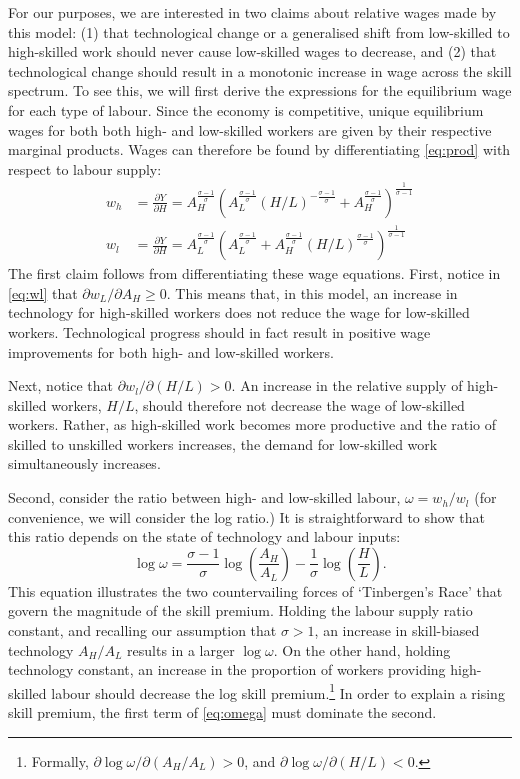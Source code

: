 \documentclass[a4paper,11pt]{article}
\begin{document}
For our purposes, we are interested in two claims about relative wages made by this model: (1) that technological change or a generalised shift from low-skilled to high-skilled work should never cause low-skilled wages to decrease, and (2) that technological change should result in a monotonic increase in wage across the skill spectrum. To see this, we will first derive the expressions for the equilibrium wage for each type of labour. Since the economy is competitive, unique equilibrium wages for both both high- and low-skilled workers are given by their respective marginal products. Wages can therefore be found by differentiating \eqref{eq:prod} with respect to labour supply:
\begin{align}
w_h &= \frac{\partial Y}{\partial H} 
     = A_H^\frac{\sigma-1}{\sigma}\left(
              A_L^{\frac{\sigma-1}{\sigma}} (H/L)^{-\frac{\sigma-1}{\sigma}} + A_H^{\frac{\sigma-1}{\sigma}}
        \right)^{\frac{1}{\sigma - 1}} \label{eq:wh} \\
w_l &= \frac{\partial Y}{\partial H} 
     = A_L^\frac{\sigma-1}{\sigma}\left(
              A_L^{\frac{\sigma-1}{\sigma}} + A_H^{\frac{\sigma-1}{\sigma}}(H/L)^{\frac{\sigma-1}{\sigma}}
        \right)^{\frac{1}{\sigma - 1}} \label{eq:wl}
\end{align}
The first claim follows from differentiating these wage equations. First, notice in \eqref{eq:wl} that $\partial w_L/\partial A_H \geq 0$. This means that, in this model, an increase in technology for high-skilled workers does not reduce the wage for low-skilled workers. Technological progress should in fact result in positive wage improvements for both high- and low-skilled workers. 

Next, notice that $\partial w_l/\partial(H/L)>0$. An increase in the relative supply of high-skilled workers, $H/L$, should therefore not decrease the wage of low-skilled workers. Rather, as high-skilled work becomes more productive and the ratio of skilled to unskilled workers increases, the demand for low-skilled work simultaneously increases.

Second, consider the ratio between high- and low-skilled labour, $\omega=w_h/w_l$ (for convenience, we will consider the log ratio.) It is straightforward to show that this ratio depends on the state of technology and labour inputs:
\begin{equation}\label{eq:omega}
\log \omega = \frac{\sigma-1}{\sigma}\log\left(\frac{A_H}{A_L}\right) - \frac{1}{\sigma}\log\left(\frac{H}{L}\right).
\end{equation}
This equation illustrates the two countervailing forces of `Tinbergen's Race' that govern the magnitude of the skill premium. Holding the labour supply ratio constant, and recalling our assumption that $\sigma >1$, an increase in skill-biased technology $A_H/A_L$ results in a larger $\log\omega$. On the other hand, holding technology constant, an increase in the proportion of workers providing high-skilled labour should decrease the log skill premium.\footnote{Formally, $\partial \log\omega / \partial(A_H/A_L) > 0$, and 
$\partial \log\omega / \partial(H/L) < 0$.} In order to explain a rising skill premium, the first term of \eqref{eq:omega} must dominate the second.
\end{document}
